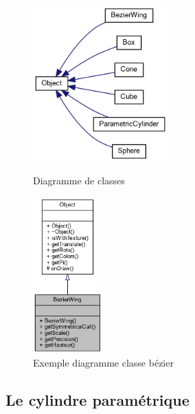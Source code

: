 \documentclass{article}
\begin{document}
\begin{figure}[!htb]
	\begin{minipage}{0.5\textwidth}
    	\centering
    	\includegraphics[height=6cm]{./assets/class_hierarchy.png}
    	\caption{Diagramme de classes}
    	\label{fig:class_hierarchy}
	\end{minipage}
	\hfill
	\begin{minipage}{0.5\textwidth}
    	\centering
    	\includegraphics[height=6cm]{./assets/class_hierarchy_bezier.png}
    	\caption{Exemple diagramme classe bézier}
    	\label{fig:class_hierarchy_bezier}
	\end{minipage}
\end{figure}


\subsection{Le cylindre paramétrique}
\end{document}
